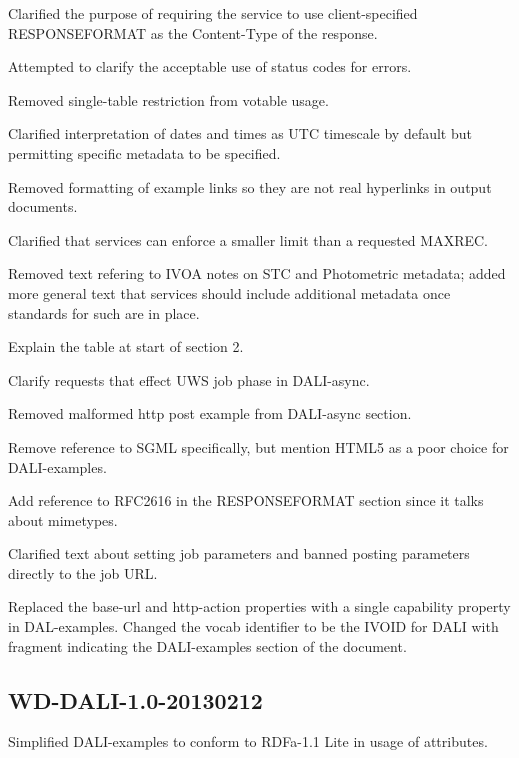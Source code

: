 \documentclass[11pt,letter]{ivoa}
\begin{document}
Clarified the purpose of requiring the service to use client-specified 
RESPONSEFORMAT as the Content-Type of the response.

Attempted to clarify the acceptable use of status codes for errors.

Removed single-table restriction from votable usage.

Clarified interpretation of dates and times as UTC timescale by default but 
permitting specific metadata to be specified.

Removed formatting of example links so they are not real hyperlinks in output 
documents.

Clarified that services can enforce a smaller limit than a requested MAXREC.

Removed text refering to IVOA notes on STC and Photometric metadata; added more 
general text that services should include additional metadata once standards for 
such are in place.

Explain the table at start of section 2.

Clarify requests that effect UWS job phase in DALI-async.

Removed malformed http post example from DALI-async section.

Remove reference to SGML specifically, but mention HTML5 as a poor choice for 
DALI-examples.

Add reference to RFC2616 in the RESPONSEFORMAT section since it talks about 
mimetypes.

Clarified text about setting job parameters and banned posting parameters 
directly to the job URL.

Replaced the base-url and http-action properties with a single capability 
property in DAL-examples. Changed the vocab identifier to be the IVOID for DALI 
with fragment indicating the DALI-examples section of the document.

\subsection{WD-DALI-1.0-20130212}
Simplified DALI-examples to conform to RDFa-1.1 Lite in usage of attributes.


\end{document}
